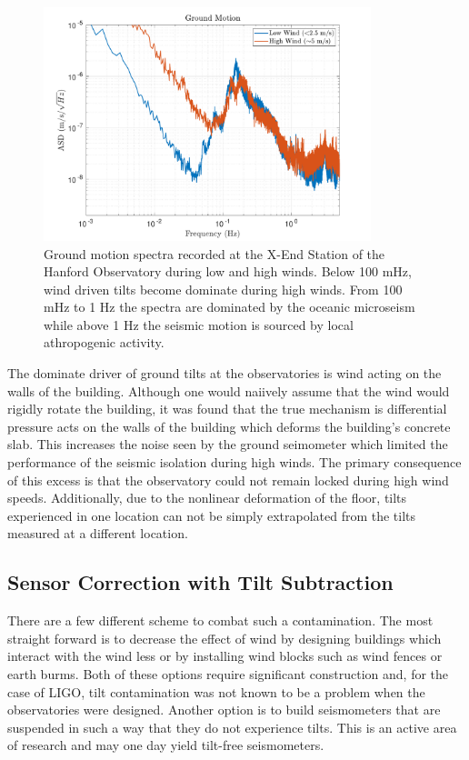 \documentclass [12pt, proquest]{uwthesis}[2019]
\begin{document}
\begin{figure}[!h]
\begin{center}
\includegraphics[width=0.85\textwidth]{windComp2.pdf}
\caption[Ground motion spectra during low and high winds]{Ground motion spectra recorded at the X-End Station of the Hanford Observatory during low and high winds. Below 100 mHz, wind driven tilts become dominate during high winds. From 100 mHz to 1 Hz the spectra are dominated by the oceanic microseism while above 1 Hz the seismic motion is sourced by local athropogenic activity.}
\label{wind}
\end{center}
\end{figure}

The dominate driver of ground tilts at the observatories is wind acting on the walls of the building. Although one would naiively assume that the wind would rigidly rotate the building, it was found that the true mechanism is differential pressure acts on the walls of the building which deforms the building's concrete slab. This increases the noise seen by the ground seimometer which limited the performance of the seismic isolation during high winds. The primary consequence of this excess is that the observatory could not remain locked during high wind speeds. Additionally, due to the nonlinear deformation of the floor, tilts experienced in one location can not be simply extrapolated from the tilts measured at a different location.

\subsection{Sensor Correction with Tilt Subtraction}

\quad There are a few different scheme to combat such a contamination. The most straight forward is to decrease the effect of wind by designing buildings which interact with the wind less or by installing wind blocks such as wind fences or earth burms. Both of these options require significant construction and, for the case of LIGO, tilt contamination was not known to be a problem when the observatories were designed. Another option is to build seismometers that are suspended in such a way that they do not experience tilts. This is an active area of research and may one day yield tilt-free seismometers. \cite{tiltFree}
\end{document}
